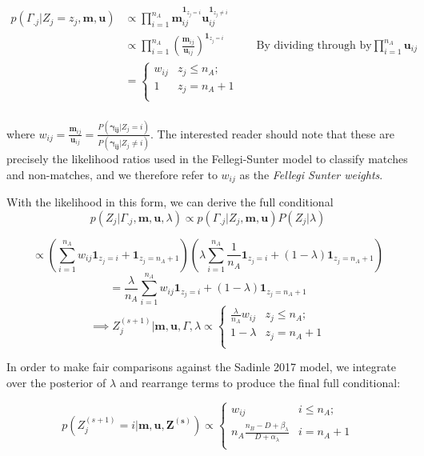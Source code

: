 \documentclass[
  12pt,
]{article}
\begin{document}
\begin{align*}
p(\Gamma_{.j}|Z_j = z_j, \mathbf{m}, \mathbf{u}) &\propto \prod_{i=1}^{n_A}\mathbf{m}_{ij}^{\mathbf{1}_{z_j = i}}\mathbf{u}_{ij}^{\mathbf{1}_{z_j \neq i}}\\
&\propto \prod_{i=1}^{n_A}\left(\frac{\mathbf{m}_{ij}}{\mathbf{u}_{ij}}\right)^{\mathbf{1}_{z_j = i}} && \text{By dividing through by} \prod_{i = 1}^{n_A}\mathbf{u}_{ij}\\
&=
\begin{cases} 
    w_{ij}  & z_j \leq n_A; \\
    1 &  z_j  = n_A + 1 \\
\end{cases}\\
\end{align*}

where
\(w_{ij} = \frac{\mathbf{m}_{ij}}{\mathbf{u}_{ij}} = \frac{P(\boldsymbol{\gamma_{ij}}|Z_j = i)}{P(\boldsymbol{\gamma_{ij}} |Z_j \neq i)}\).
The interested reader should note that these are precisely the
likelihood ratios used in the Fellegi-Sunter model to classify matches
and non-matches, and we therefore refer to \(w_{ij}\) as the
\emph{Fellegi Sunter weights}.

With the likelihood in this form, we can derive the full conditional
\[p(Z_j|\Gamma_{.j}, \mathbf{m} ,\mathbf{u}, \lambda) \propto p(\Gamma_{.j}| Z_j, \mathbf{m} ,\mathbf{u}) P(Z_j|\lambda)\]

\[\propto \left(\sum_{i=1}^{n_A}w_{ij}\mathbf{1}_{z_j = i} + \mathbf{1}_{z_j = n_A + 1}\right)\left(\lambda\sum_{i=1}^{n_A}\frac{1}{n_A}\mathbf{1}_{z_j = i} + (1-\lambda)\mathbf{1}_{z_j = n_A + 1}\right)\]
\[= \frac{\lambda}{n_A}\sum_{i=1}^{n_A}w_{ij}\mathbf{1}_{z_j = i} + (1-\lambda)\mathbf{1}_{z_j = n_A + 1} \]
\[ \implies Z_j^{(s+1)} | \mathbf{m}, \mathbf{u}, \Gamma, \lambda \propto
\begin{cases} 
    \frac{\lambda}{n_A}w_{ij}   & z_j \leq n_A; \\
     1-\lambda &  z_j  = n_A + 1 \\
\end{cases}\]

In order to make fair comparisons against the Sadinle 2017 model, we
integrate over the posterior of \(\lambda\) and rearrange terms to
produce the final full conditional:

\[p\left(Z_j^{(s+1)}  = i| \mathbf{m}, \mathbf{u}, \mathbf{Z^{(s)}}\right) \propto
\begin{cases} 
    w_{ij}  & i \leq n_A; \\
     n_A \frac{n_B - D + \beta_{\lambda}}{D + \alpha_{\lambda}} & i  = n_A + 1 \\
\end{cases}\]
\end{document}
